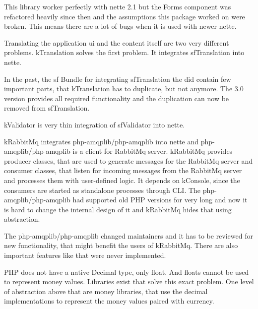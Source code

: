 This library worker perfectly with \gls{nette} 2.1 but the Forms component was refactored heavily since then and the assumptions this package worked on were broken. This means there are a lot of bugs when it is used with newer \gls{nette}.

 \label{sec:state:translation}

Translating the application \gls{ui} and the content itself are two very different problems. \gls{kTranslation} solves the first problem. It integrates \gls{sfTranslation} into \gls{nette}.

In the past, the \gls{sf} Bundle for integrating \gls{sfTranslation} the did contain few important parts, that \gls{kTranslation} has to duplicate, but not anymore. The 3.0 version provides all required functionality and the duplication can now be removed from \gls{sfTranslation}.

 \label{sec:state:validator}

\gls{kValidator} is very thin integration of \gls{sfValidator} into \gls{nette}.

 \label{sec:state:rabbit-mq}

\gls{kRabbitMq} integrates php-amqplib/php-amqplib into \gls{nette} and php-amqplib/php-amqplib is a client for RabbitMq server. \gls{kRabbitMq} provides producer classes, that are used to generate messages for the RabbitMq server and consumer classes, that listen for incoming messages from the RabbitMq server and processes them with user-defined logic. It depends on \gls{kConsole}, since the consumers are started as standalone processes through CLI. The php-amqplib/php-amqplib had supported old PHP versions for very long and now it is hard to change the internal design of it and \gls{kRabbitMq} hides that using abstraction.

The php-amqplib/php-amqplib changed maintainers and it has to be reviewed for new functionality, that might benefit the users of \gls{kRabbitMq}. There are also important features like  that were never implemented.

 \label{sec:state:money}

PHP does not have a native Decimal type, only float. And floats cannot be used to represent money values. Libraries exist that solve this exact problem. One level of abstraction above that are money libraries, that use the decimal implementations to represent the money values paired with currency.

